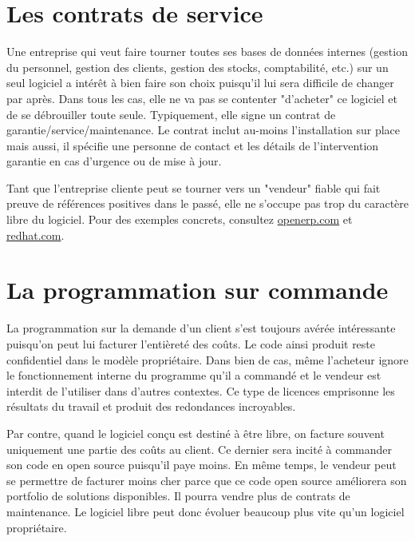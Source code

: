 \section*{Les contrats de service}
Une entreprise qui veut faire tourner toutes ses bases de données internes (gestion du personnel,
gestion des clients, gestion des stocks, comptabilité, etc.) sur un seul logiciel a intérêt à bien faire son choix puisqu'il lui sera difficile de changer par après.%
Dans tous les cas, elle ne va pas se contenter "d'acheter" ce logiciel et de se débrouiller toute seule.
Typiquement, elle signe un contrat de garantie/service/maintenance. %
Le contrat inclut au-moins l'installation sur place mais aussi, il spécifie une personne de contact et les détails de l'intervention garantie en cas d'urgence ou de mise à jour.

Tant que l'entreprise cliente peut se tourner vers un "vendeur" fiable qui fait preuve de références 
positives dans le passé, elle ne s'occupe pas trop du caractère libre du logiciel. 
Pour des exemples concrets, consultez \url{openerp.com} et \url{redhat.com}.

\section*{La programmation sur commande}
La programmation sur la demande d'un client %
s'est toujours avérée intéressante puisqu'on
peut lui facturer l'entièreté des coûts. Le code ainsi produit reste confidentiel dans le
modèle propriétaire. Dans bien de cas, même l'acheteur ignore le fonctionnement 
interne du programme qu'il a commandé et le vendeur est interdit de l'utiliser dans d'autres contextes.
Ce type de licences emprisonne les résultats du travail et produit des redondances incroyables.

Par contre, quand le logiciel conçu est destiné à être libre, on facture souvent uniquement une partie 
des coûts au client. Ce dernier sera incité à commander son code en open source puisqu'il paye moins. %
En même temps, le vendeur peut se permettre de facturer moins cher parce que ce code open source
améliorera son portfolio de solutions disponibles. Il pourra vendre plus de contrats de maintenance.
Le logiciel libre peut donc évoluer beaucoup plus vite qu'un logiciel propriétaire.

